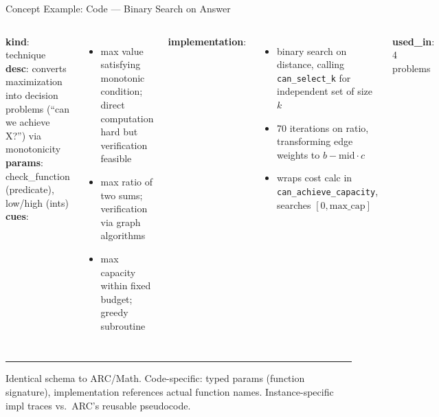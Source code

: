 \documentclass[10pt]{beamer}
\begin{document}
\begin{frame}{Concept Example: \textcolor{codeorange}{Code} --- Binary Search on Answer}
  \begin{columns}[T]
    {\scriptsize
    \textbf{kind}: technique\\
    \textbf{desc}: converts maximization into decision problems (``can we achieve X?'') via monotonicity\\
    \textbf{params}: check\_function (predicate), low/high (ints)\\[0.3em]
    \textbf{cues}:
    \begin{itemize}\setlength\itemsep{0pt}
      \item max value satisfying monotonic condition; direct computation hard but verification feasible
      \item max ratio of two sums; verification via graph algorithms
      \item max capacity within fixed budget; greedy subroutine
    \end{itemize}
    }

    {\scriptsize
    \textbf{implementation}:
    \begin{itemize}\setlength\itemsep{0pt}
      \item binary search on distance, calling \texttt{can\_select\_k} for independent set of size $k$
      \item 70 iterations on ratio, transforming edge weights to $b - \text{mid} \cdot c$
      \item wraps cost calc in \texttt{can\_achieve\_capacity}, searches $[0, \text{max\_cap}]$
    \end{itemize}
    \vspace{0.3em}
    \textbf{used\_in}: 4 problems
    }
  \end{columns}

  \vspace{0.7em}
  \hrule
  \vspace{0.3em}
  {\footnotesize Identical schema to ARC/Math. Code-specific: typed params (function signature), implementation references actual function names. Instance-specific impl traces vs.\ ARC's reusable pseudocode.}
\end{frame}
\end{document}
